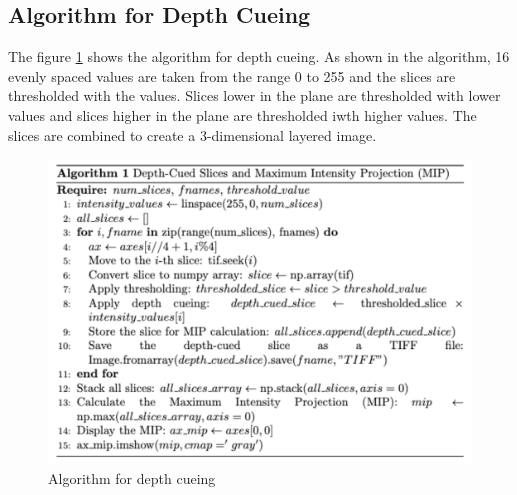 \documentclass{article}
\begin{document}
\subsection*{Algorithm for Depth Cueing}
The figure \ref{fig:depth-cuing} shows the algorithm for depth cueing. As shown in the algorithm, 16 evenly spaced values are taken from the range 0 to 255 and the slices are thresholded with the values. Slices lower in the plane are thresholded with lower values and slices higher in the plane are thresholded iwth higher values. The slices are combined to create a 3-dimensional layered image. 
\begin{figure}[h!]
    \centering
    \includegraphics[width=0.8\linewidth]{Report/Images/depth_cuing.png}
    \caption{Algorithm for depth cueing }
    \label{fig:depth-cuing}
\end{figure}
\end{document}
